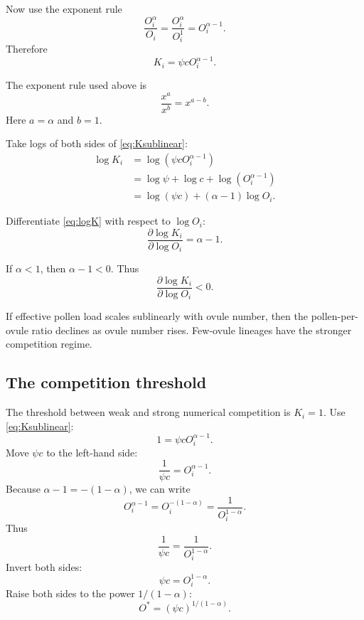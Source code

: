 \documentclass[12pt]{article}
\begin{document}
Now use the exponent rule
\begin{equation}
\frac{O_i^\alpha}{O_i}=\frac{O_i^\alpha}{O_i^1}=O_i^{\alpha-1}.
\end{equation}
Therefore
\begin{equation}
K_i=\psi c O_i^{\alpha-1}.
\label{eq:Ksublinear}
\end{equation}

\begin{rulebox}
The exponent rule used above is
\[
\frac{x^a}{x^b}=x^{a-b}.
\]
Here $a=\alpha$ and $b=1$.
\end{rulebox}

Take logs of both sides of \eqref{eq:Ksublinear}:
\begin{align}
\log K_i
&=\log(\psi c O_i^{\alpha-1}) \\
&=\log \psi + \log c + \log(O_i^{\alpha-1}) \\
&=\log(\psi c) + (\alpha-1)\log O_i.
\label{eq:logK}
\end{align}

Differentiate \eqref{eq:logK} with respect to $\log O_i$:
\begin{equation}
\frac{\partial \log K_i}{\partial \log O_i}=\alpha-1.
\label{eq:dlogKdlogO}
\end{equation}

If $\alpha<1$, then $\alpha-1<0$. Thus
\begin{equation}
\frac{\partial \log K_i}{\partial \log O_i}<0.
\end{equation}

\begin{conclusionbox}
If effective pollen load scales sublinearly with ovule number, then the pollen-per-ovule ratio declines as ovule number rises. Few-ovule lineages have the stronger competition regime.
\end{conclusionbox}

\subsection{The competition threshold}

The threshold between weak and strong numerical competition is $K_i=1$. Use \eqref{eq:Ksublinear}:
\begin{equation}
1=\psi c O_i^{\alpha-1}.
\end{equation}
Move $\psi c$ to the left-hand side:
\begin{equation}
\frac{1}{\psi c}=O_i^{\alpha-1}.
\end{equation}
Because $\alpha-1=-(1-\alpha)$, we can write
\begin{equation}
O_i^{\alpha-1}=O_i^{-(1-\alpha)}=\frac{1}{O_i^{1-\alpha}}.
\end{equation}
Thus
\begin{equation}
\frac{1}{\psi c}=\frac{1}{O_i^{1-\alpha}}.
\end{equation}
Invert both sides:
\begin{equation}
\psi c = O_i^{1-\alpha}.
\end{equation}
Raise both sides to the power $1/(1-\alpha)$:
\begin{equation}
O^*=(\psi c)^{1/(1-\alpha)}.
\label{eq:Ostar}
\end{equation}
\end{document}
